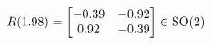 \documentclass[preview]{standalone}
\begin{document}
\begin{align*}
\special{dvisvgm:raw <g id='unique000'>}R(1.98) = \begin{bmatrix} -0.39 & -0.92 \\ 0.92 & -0.39 \end{bmatrix} \in \text{SO}(2)\special{dvisvgm:raw </g>}
\end{align*}
\end{document}
